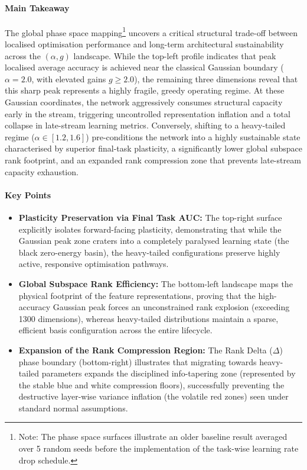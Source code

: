 \documentclass[10pt,a4paper]{article}
\begin{document}
	\paragraph{Main Takeaway}
	The global phase space mapping\footnote{Note: The phase space surfaces illustrate an older baseline result averaged over 5 random seeds before the implementation of the task-wise learning rate drop schedule.} uncovers a critical structural trade-off between localised optimisation performance and long-term architectural sustainability across the $(\alpha, g)$ landscape. While the top-left profile indicates that peak localised average accuracy is achieved near the classical Gaussian boundary ($\alpha = 2.0$, with elevated gains $g \ge 2.0$), the remaining three dimensions reveal that this sharp peak represents a highly fragile, greedy operating regime. At these Gaussian coordinates, the network aggressively consumes structural capacity early in the stream, triggering uncontrolled representation inflation and a total collapse in late-stream learning metrics. Conversely, shifting to a heavy-tailed regime ($\alpha \in [1.2, 1.6]$) pre-conditions the network into a highly sustainable state characterised by superior final-task plasticity, a significantly lower global subspace rank footprint, and an expanded rank compression zone that prevents late-stream capacity exhaustion.
	
	\paragraph{Key Points}
	\begin{itemize}
		\item \textbf{Plasticity Preservation via Final Task AUC:} The top-right surface explicitly isolates forward-facing plasticity, demonstrating that while the Gaussian peak zone craters into a completely paralysed learning state (the black zero-energy basin), the heavy-tailed configurations preserve highly active, responsive optimisation pathways.
		\item \textbf{Global Subspace Rank Efficiency:} The bottom-left landscape maps the physical footprint of the feature representations, proving that the high-accuracy Gaussian peak forces an unconstrained rank explosion (exceeding 1300 dimensions), whereas heavy-tailed distributions maintain a sparse, efficient basis configuration across the entire lifecycle.
		\item \textbf{Expansion of the Rank Compression Region:} The Rank Delta ($\Delta$) phase boundary (bottom-right) illustrates that migrating towards heavy-tailed parameters expands the disciplined info-tapering zone (represented by the stable blue and white compression floors), successfully preventing the destructive layer-wise variance inflation (the volatile red zones) seen under standard normal assumptions.
	\end{itemize}
	
\end{document}
